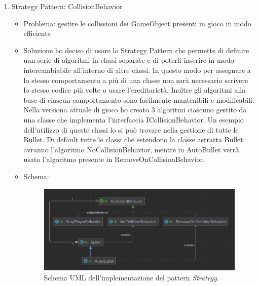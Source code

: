 \documentclass[a4paper,12pt]{report}
\begin{document}
\begin{enumerate}
		\item Strategy Pattern: CollisionBehavior
	\begin{itemize}
		\item Problema: gestire le collissioni dei GameObject presenti in gioco in modo efficiente 
		\item Soluzione ho deciso di usare lo Strategy Pattern che permette di definire uan serie di algoritmi in classi separate e di poterli inserire in modo intercambiabile all'interno di altre classi.
		In questo modo per assegnare a lo stesso comportamento a più di una classe non sarà necessario scrivere lo stesso codice più volte o usare l'ereditarietà.
		Inoltre gli algoritmi alla base di ciascun comportamento sono facilmente mantenibili e modificabili. \\
		Nella versiona attuale di gioco ho creato 3 algoritmi ciascuno gestito da una classe che implementa l'interfaccia ICollisionBehavior. 
		Un esempio dell'utilizzo di queste classi lo si può trovare nella gestione di tutte le Bullet. Di default tutte le classi che estendono la classe astratta Bullet avranno l'algoritmo NoCollisionBehavior, mentre in AutoBullet verrà usato l'algoritmo presente in RemoveOnCollisionBehavior.
		\item Schema:
		\begin{figure}[H]
			\centering{}
			\includegraphics[width=\textwidth]{img/strategy.png}
			\caption{Schema UML dell'implementazione del pattern \emph{Strategy}. }
			\label{img:Strategy Pattern}
		\end{figure}
		

\end{itemize}
\end{enumerate}
\end{document}
